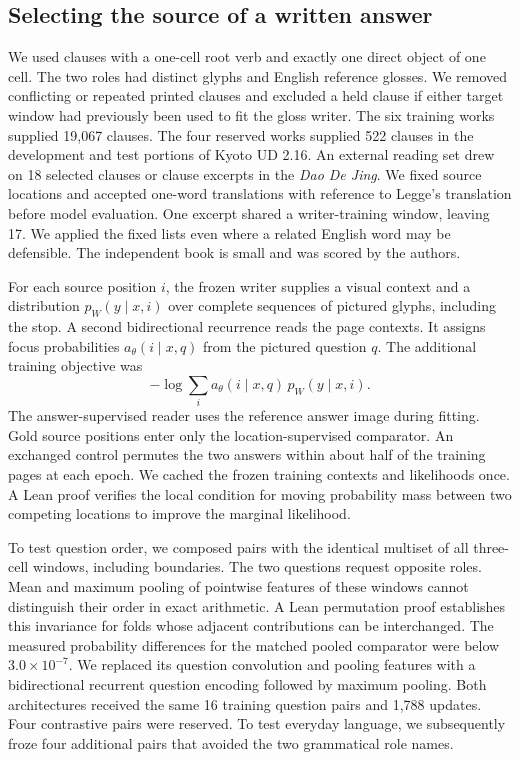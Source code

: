 \subsection*{Selecting the source of a written answer}
We used clauses with a one-cell root verb and exactly one direct object of one cell. The two roles had distinct glyphs and English reference glosses. We removed conflicting or repeated printed clauses and excluded a held clause if either target window had previously been used to fit the gloss writer. The six training works supplied 19,067 clauses. The four reserved works supplied 522 clauses in the development and test portions of Kyoto UD 2.16. An external reading set drew on 18 selected clauses or clause excerpts in the \textit{Dao De Jing}. We fixed source locations and accepted one-word translations with reference to Legge's translation before model evaluation. One excerpt shared a writer-training window, leaving 17. We applied the fixed lists even where a related English word may be defensible. The independent book is small and was scored by the authors.

For each source position $i$, the frozen writer supplies a visual context and a distribution $p_W(y\mid x,i)$ over complete sequences of pictured glyphs, including the stop. A second bidirectional recurrence reads the page contexts. It assigns focus probabilities $a_\theta(i\mid x,q)$ from the pictured question $q$. The additional training objective was
\[
 -\log\sum_i a_\theta(i\mid x,q)\,p_W(y\mid x,i).
\]
The answer-supervised reader uses the reference answer image during fitting. Gold source positions enter only the location-supervised comparator. An exchanged control permutes the two answers within about half of the training pages at each epoch. We cached the frozen training contexts and likelihoods once. A Lean proof verifies the local condition for moving probability mass between two competing locations to improve the marginal likelihood.

To test question order, we composed pairs with the identical multiset of all three-cell windows, including boundaries. The two questions request opposite roles. Mean and maximum pooling of pointwise features of these windows cannot distinguish their order in exact arithmetic. A Lean permutation proof establishes this invariance for folds whose adjacent contributions can be interchanged. The measured probability differences for the matched pooled comparator were below $3.0\times10^{-7}$. We replaced its question convolution and pooling features with a bidirectional recurrent question encoding followed by maximum pooling. Both architectures received the same 16 training question pairs and 1,788 updates. Four contrastive pairs were reserved. To test everyday language, we subsequently froze four additional pairs that avoided the two grammatical role names.

